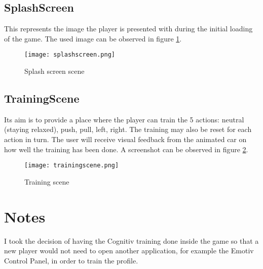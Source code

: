 \subsection{SplashScreen}
This represents the image the player is presented with during the initial loading of the game. The used image can be observed in figure \ref{fig:splashscreenscene}.

\begin{figure}
  \centering
  \texttt{[image: splashscreen.png]}
  \caption{Splash screen scene}
    \label{fig:splashscreenscene}           
\end{figure}

\subsection{TrainingScene}
Its aim is to provide a place where the player can train the 5 actions: neutral (staying relaxed), push, pull, left, right. The training may also be reset for each action in turn. The user will receive visual feedback from the animated car on how well the training has been done. A screenshot can be observed in figure \ref{fig:trainingscene}.

\begin{figure}
  \centering
  \texttt{[image: trainingscene.png]}
  \caption{Training scene}
    \label{fig:trainingscene}           
\end{figure}

\section{Notes}

I took the decision of having the Cognitiv training done inside the game so that a new player would not need to open another application, for example the Emotiv Control Panel, in order to train the profile.

